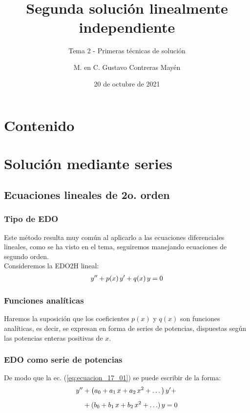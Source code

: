 \documentclass[12pt]{beamer}
\date{20 de octubre de 2021}
\title{\large{Segunda solución linealmente independiente}}
\subtitle{Tema 2 - Primeras técnicas de solución}
\author{M. en C. Gustavo Contreras Mayén}
\begin{document}
\maketitle
\fontsize{14}{14}\selectfont
{}

\section*{Contenido}

\section{Solución mediante series}
\subsection{Ecuaciones lineales de 2o. orden}

\begin{frame}
\frametitle{Tipo de EDO}
Este método resulta muy común al aplicarlo a las ecuaciones diferenciales lineales, como se ha visto en el tema, seguiremos manejando ecuaciones de segundo orden.
\\
\bigskip
\pause
Consideremos la EDO2H lineal:
\pause
\begin{align}
    {y}^{\prime \prime} + p(x) \, {y}^{\prime} + q(x) \, y = 0
    \label{eq:ecuacion_17_01}
\end{align}
\end{frame}
\begin{frame}
\frametitle{Funciones analíticas}
Haremos la suposición que los coeficientes $p(x)$ y $q(x)$ son funciones analíticas, \pause es decir, se expresan en forma de series de potencias, dispuestas según las potencias enteras positivas de $x$.
\end{frame}
\begin{frame}
\frametitle{EDO como serie de potencias}
De modo que la ec. (\ref{eq:ecuacion_17_01}) se puede escribir de la forma:
\pause
\begin{align}
\begin{aligned}[b]
{y}^{\prime \prime} &+ \big( a_{0} + a_{1} \, x + a_{2} \, x^{2} + \ldots \big) \, {y}^{\prime} + \\[0.5em]
&+ (b_{0} + b_{1} \, x + b_{2} \, x^{2} + \ldots) \, y = 0
\end{aligned}
\label{eq:ecuacion_17_02}
\end{align}
\end{frame}
\end{document}
